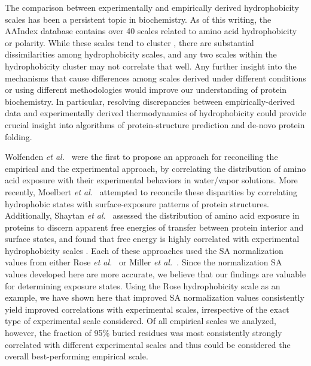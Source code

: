 \documentclass[11pt]{article}
\begin{document}
The comparison between experimentally and empirically derived hydrophobicity scales has been a persistent topic in biochemistry. As of this writing, the AAIndex database \cite{KawashimaKanehisa2000} contains over 40 scales related to amino acid hydrophobicity or polarity. While these scales tend to cluster \cite{TomiiKanehisa1996,Kawashimaetal2008}, there are substantial dissimilarities among hydrophobicity scales, and any two scales within the hydrophobicity cluster may not correlate that well. Any further insight into the mechanisms that cause differences among scales derived under different conditions or using different methodologies would improve our understanding of protein biochemistry. In particular, resolving discrepancies between empirically-derived data and experimentally derived thermodynamics of hydrophobicity could provide crucial insight into algorithms of protein-structure prediction and de-novo protein folding. 

Wolfenden \emph{et al.}~\cite{Wolfenden1981} were the first to propose an approach for reconciling the empirical and the experimental approach, by correlating the distribution of amino acid exposure with their experimental behaviors in water/vapor solutions. More recently, Moelbert \emph{et al.}~\cite{Moelbert2004} attempted to reconcile these disparities by correlating hydrophobic states with surface-exposure patterns of protein structures. Additionally, Shaytan \emph{et al.}~\cite{Shaytan2009} assessed the distribution of amino acid exposure in proteins to discern apparent free energies of transfer between protein interior and surface states, and found that free energy is highly correlated with experimental hydrophobicity scales \cite{Shaytan2009}. Each of these approaches used the SA normalization values from either Rose \emph{et al.}~\cite{Rose1985} or Miller \emph{et al.}~\cite{Miller1987}. Since the normalization SA values developed here are more accurate, we believe that our findings are valuable for determining exposure states. Using the Rose hydrophobicity scale as an example, we have shown here that improved SA normalization values consistently yield improved correlations with experimental scales, irrespective of the exact type of experimental scale considered.  Of all empirical scales we analyzed, however, the fraction of 95\% buried residues was most consistently strongly correlated with different experimental scales and thus could be considered the overall best-performing empirical scale. 
\end{document}
